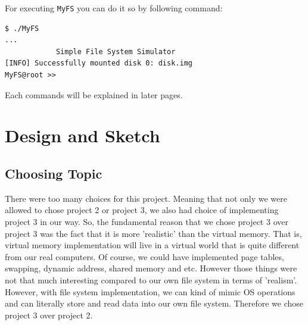 \documentclass{homework}
\begin{document}
For executing \texttt{MyFS} you can do it so by following command:
\\

\begin{center}
\begin{code}
\begin{verbatim}
$ ./MyFS
...
            Simple File System Simulator
[INFO] Successfully mounted disk 0: disk.img
MyFS@root >>
\end{verbatim}
\end{code}
\end{center}

Each commands will be explained in later pages.
\pagebreak

\section{Design and Sketch}
\subsection{Choosing Topic}
There were too many choices for this project. Meaning that not only we were allowed to chose project 2 or project 3, we also had choice of implementing project 3 in our way. So, the fundamental reason that we chose project 3 over project 3 was the fact that it is more 'realistic' than the virtual memory. That is, virtual memory implementation will live in a virtual world that is quite different from our real computers. Of course, we could have implemented page tables, swapping, dynamic address, shared memory and etc. However those things were not that much interesting compared to our own file system in terms of 'realism'. However, with file system implementation, we can kind of mimic OS operations and can literally store and read data into our own file system. Therefore we chose project 3 over project 2. 
\end{document}
